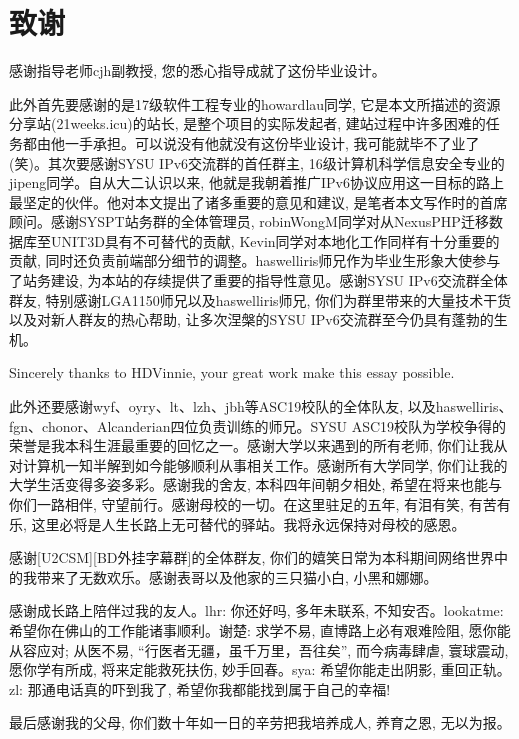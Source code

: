 
\chapter{致谢}

感谢指导老师cjh副教授, 您的悉心指导成就了这份毕业设计。

此外首先要感谢的是17级软件工程专业的howardlau同学, 它是本文所描述的资源分享站(21weeks.icu)的站长, 是整个项目的实际发起者, 建站过程中许多困难的任务都由他一手承担。可以说没有他就没有这份毕业设计, 我可能就毕不了业了(笑)。其次要感谢SYSU IPv6交流群的首任群主, 16级计算机科学信息安全专业的jipeng同学。自从大二认识以来, 他就是我朝着推广IPv6协议应用这一目标的路上最坚定的伙伴。他对本文提出了诸多重要的意见和建议, 是笔者本文写作时的首席顾问。感谢SYSPT站务群的全体管理员, robinWongM同学对从NexusPHP迁移数据库至UNIT3D具有不可替代的贡献, Kevin同学对本地化工作同样有十分重要的贡献, 同时还负责前端部分细节的调整。haswelliris师兄作为毕业生形象大使参与了站务建设, 为本站的存续提供了重要的指导性意见。感谢SYSU IPv6交流群全体群友, 特别感谢LGA1150师兄以及haswelliris师兄, 你们为群里带来的大量技术干货以及对新人群友的热心帮助, 让多次涅槃的SYSU IPv6交流群至今仍具有蓬勃的生机。

Sincerely thanks to HDVinnie, your great work make this essay possible.

此外还要感谢wyf、oyry、lt、lzh、jbh等ASC19校队的全体队友, 以及haswelliris、fgn、chonor、Alcanderian四位负责训练的师兄。SYSU ASC19校队为学校争得的荣誉是我本科生涯最重要的回忆之一。感谢大学以来遇到的所有老师, 你们让我从对计算机一知半解到如今能够顺利从事相关工作。感谢所有大学同学, 你们让我的大学生活变得多姿多彩。感谢我的舍友, 本科四年间朝夕相处, 希望在将来也能与你们一路相伴, 守望前行。感谢母校的一切。在这里驻足的五年, 有泪有笑, 有苦有乐, 这里必将是人生长路上无可替代的驿站。我将永远保持对母校的感恩。

感谢[U2CSM][BD外挂字幕群]的全体群友, 你们的嬉笑日常为本科期间网络世界中的我带来了无数欢乐。感谢表哥以及他家的三只猫小白, 小黑和娜娜。

感谢成长路上陪伴过我的友人。lhr: 你还好吗, 多年未联系, 不知安否。lookatme: 希望你在佛山的工作能诸事顺利。谢楚: 求学不易, 直博路上必有艰难险阻, 愿你能从容应对; 从医不易, ``行医者无疆，虽千万里，吾往矣'', 而今病毒肆虐, 寰球震动, 愿你学有所成, 将来定能救死扶伤, 妙手回春。sya: 希望你能走出阴影, 重回正轨。zl: 那通电话真的吓到我了, 希望你我都能找到属于自己的幸福!

最后感谢我的父母, 你们数十年如一日的辛劳把我培养成人, 养育之恩, 无以为报。
